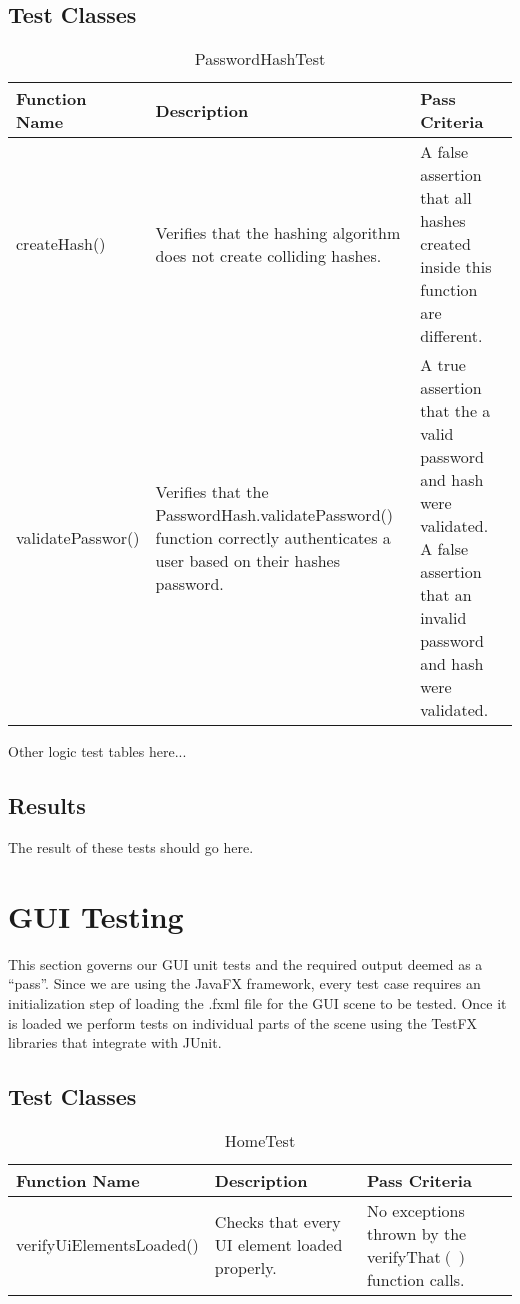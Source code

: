 \documentclass[14pt, a4paper]{article}
\begin{document}
\subsection{Test Classes}

\begin{table}[h]
	\centering	
	\caption{PasswordHashTest}
	\begin{tabular}{|p{3cm}|p{6cm}|p{6cm}|} 
		\hline
		\textbf{Function Name} & \textbf{Description} & \textbf{Pass Criteria}  \\\hline
		createHash() & Verifies that the hashing algorithm does not create colliding hashes. & A false assertion that all hashes created inside this function are different. \\\hline
		validatePasswor() & Verifies that the PasswordHash.validatePassword() function correctly authenticates a user based on their hashes password. & A true assertion that the a valid password and hash were validated. A false assertion that an invalid password and hash were validated.  \\\hline
	\end{tabular}
\end{table}

Other logic test tables here...

\newpage

\subsection{Results}

The result of these tests should go here.

\newpage

\section{GUI Testing}

This section governs our GUI unit tests and the required output deemed as a ``pass''. Since we are using the JavaFX framework, every test case requires an initialization step of loading the .fxml file for the GUI scene to be tested. Once it is loaded we perform tests on individual parts of the scene using the TestFX libraries that integrate with JUnit.

\subsection{Test Classes}

\begin{table}[h]
	\centering	
	\caption{HomeTest}
	\begin{tabular}{|p{4cm}|p{5cm}|p{6cm}|} 
		\hline
		\textbf{Function Name} & \textbf{Description} & \textbf{Pass Criteria}  \\\hline
		verifyUiElementsLoaded() & Checks that every UI element loaded properly. & No exceptions thrown by the verifyThat$\left(\right)$ function calls. \\\hline
	\end{tabular}
\end{table}
\end{document}
